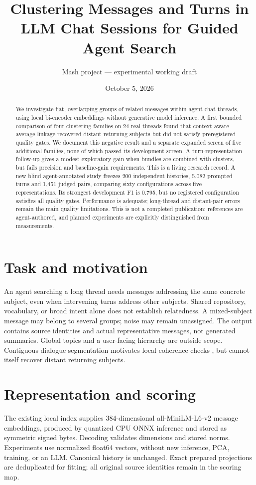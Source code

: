 \documentclass[11pt]{article}
\title{Clustering Messages and Turns in LLM Chat Sessions for Guided Agent Search}
\author{Mash project --- experimental working draft}
\date{October 5, 2026}
\begin{document}
\maketitle
\begin{abstract}
We investigate flat, overlapping groups of related messages within agent chat
threads, using local bi-encoder embeddings without generative model inference. A first
bounded comparison of four clustering families on 24 real threads found that
context-aware average linkage recovered distant returning subjects but did not
satisfy preregistered quality gates. We document this negative result and a
separate expanded screen of five additional families, none of which passed its
development screen. A turn-representation follow-up gives a modest exploratory
gain when bundles are combined with clusters, but fails precision and baseline-gain
requirements. This is a living research
record. A new blind agent-annotated study freezes 200 independent histories,
5,082 prompted turns and 1,451 judged pairs, comparing sixty configurations
across five representations. Its strongest development F1 is 0.795, but no
registered configuration satisfies all quality gates. Performance is adequate;
long-thread and distant-pair errors remain the main quality limitations. This is
not a completed publication: references are agent-authored,
and planned experiments are explicitly distinguished from measurements.
\end{abstract}

\section{Task and motivation}
An agent searching a long thread needs messages addressing the same concrete
subject, even when intervening turns address other subjects. Shared repository,
vocabulary, or broad intent alone does not establish relatedness. A mixed-subject
message may belong to several groups; noise may remain unassigned. The output
contains source identities and actual representative messages, not generated
summaries. Global topics and a user-facing hierarchy are outside scope.
Contiguous dialogue segmentation motivates local coherence checks
\cite{hearst,xing}, but cannot itself recover distant returning subjects.

\section{Representation and scoring}
The existing local index supplies 384-dimensional all-MiniLM-L6-v2 message
embeddings, produced by quantized CPU ONNX inference and stored as symmetric
signed bytes. Decoding validates dimensions and stored norms. Experiments use
normalized float64 vectors, without new inference, PCA, training, or an LLM.
Canonical history is unchanged. Exact prepared projections are deduplicated for
fitting; all original source identities remain in the scoring map.
\end{document}
